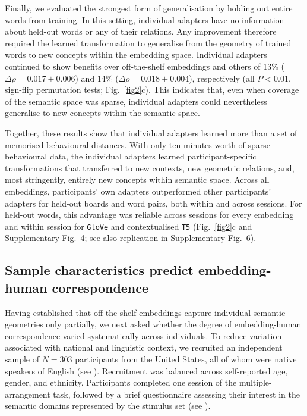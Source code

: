 \documentclass[pdflatex,sn-mathphys]{sn-jnl}
\begin{document}
Finally, we evaluated the strongest form of generalisation by holding out entire words from training. In this setting, individual adapters have no information about held-out words or any of their relations. Any improvement therefore required the learned transformation to generalise from the geometry of trained words to new concepts within the embedding space. Individual adapters continued to show benefits over off-the-shelf embeddings and others of 13\% ($\Delta\rho = 0.017\pm0.006$) and 14\% ($\Delta\rho = 0.018\pm0.004$), respectively (all $P < 0.01$, sign-flip permutation tests; Fig.~\ref{fig2}c). This indicates that, even when coverage of the semantic space was sparse, individual adapters could nevertheless generalise to new concepts within the semantic space.

Together, these results show that individual adapters learned more than a set of memorised behavioural distances. With only ten minutes worth of sparse behavioural data, the individual adapters learned participant-specific transformations that transferred to new contexts, new geometric relations, and, most stringently, entirely new concepts within semantic space. Across all embeddings, participants' own adapters outperformed other participants' adapters for held-out boards and word pairs, both within and across sessions. For held-out words, this advantage was reliable across sessions for every embedding and within session for \texttt{GloVe} and contextualised \texttt{T5} (Fig.~\ref{fig2}c and Supplementary Fig.~4; see also replication in Supplementary Fig.~6).

\subsection{Sample characteristics predict embedding-human correspondence}
Having established that off-the-shelf embeddings capture individual semantic geometries only partially, we next asked whether the degree of embedding-human correspondence varied systematically across individuals. To reduce variation associated with national and linguistic context, we recruited an independent sample of $N = 303$ participants from the United States, all of whom were native speakers of English (see ). Recruitment was balanced across self-reported age, gender, and ethnicity. Participants completed one session of the multiple-arrangement task, followed by a brief questionnaire assessing their interest in the semantic domains represented by the stimulus set (see ). 
\end{document}

